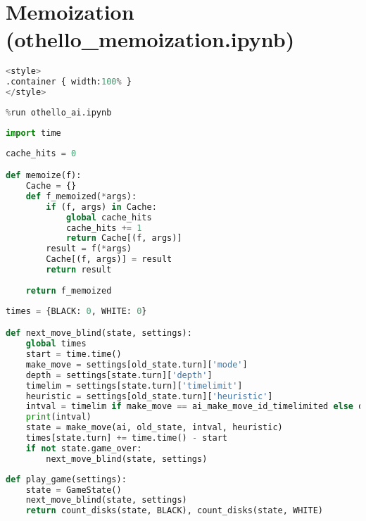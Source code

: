 \hypertarget{memoization-othello_memoization.ipynb}{%
\section{Memoization
(othello\_memoization.ipynb)}\label{memoization-othello_memoization.ipynb}}

\label{sec:memoization}

\begin{lstlisting}[language=Python]
%%HTML
<style>
.container { width:100% }
</style>
\end{lstlisting}

\begin{lstlisting}[language=Python]
%run othello_game.ipynb
%run othello_ai.ipynb
\end{lstlisting}

\begin{lstlisting}[language=Python]
import time
\end{lstlisting}

\begin{lstlisting}[language=Python]
cache_hits = 0

def memoize(f):
    Cache = {}
    def f_memoized(*args):
        if (f, args) in Cache:
            global cache_hits
            cache_hits += 1
            return Cache[(f, args)]
        result = f(*args)
        Cache[(f, args)] = result
        return result
    
    return f_memoized
\end{lstlisting}

\begin{lstlisting}[language=Python]
times = {BLACK: 0, WHITE: 0}

def next_move_blind(state, settings):
    global times
    start = time.time()
    make_move = settings[old_state.turn]['mode']
    depth = settings[state.turn]['depth']
    timelim = settings[state.turn]['timelimit']
    heuristic = settings[old_state.turn]['heuristic']
    intval = timelim if make_move == ai_make_move_id_timelimited else depth
    print(intval)
    state = make_move(ai, old_state, intval, heuristic)
    times[state.turn] += time.time() - start
    if not state.game_over:
        next_move_blind(state, settings)
\end{lstlisting}

\begin{lstlisting}[language=Python]
def play_game(settings):
    state = GameState()
    next_move_blind(state, settings)
    return count_disks(state, BLACK), count_disks(state, WHITE)
\end{lstlisting}


